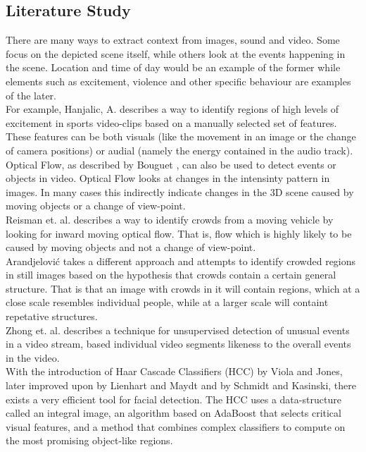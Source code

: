 \subsection{Literature Study}
%
%
There are many ways to extract context from images, sound and video. Some focus on the depicted scene itself, while others look at the events happening in the scene. Location and time of day would be an example of the former while elements such as excitement, violence and other specific behaviour are examples of the later.\\
For example, Hanjalic, A. \cite{citeulike:405480} describes a way to identify regions of high levels of excitement in sports video-clips based on a manually selected set of features. These features can be both visuals (like the movement in an image or the change of camera positions) or audial (namely the energy contained in the audio track).\\
Optical Flow, as described by Bouguet \cite{Bouguet2000}, can also be used to detect events or objects in video. Optical Flow looks at changes in the intensinty pattern in images. In many cases this indirectly indicate changes in the 3D scene caused by moving objects or a change of view-point.\\
Reisman et. al. \cite{CrowdDetectionInVideoSequences} describes a way to identify crowds from a moving vehicle by looking for inward moving optical flow. That is, flow which is highly likely to be caused by moving objects and not a change of view-point.\\
Arandjelović \cite{Arandjelovic08crowddetection} takes a different approach and attempts to identify crowded regions in still images based on the hypothesis that crowds contain a certain general structure. That is that an image with crowds in it will contain regions, which at a close scale resembles individual people, while at a larger scale will containt repetative structures.\\
Zhong et. al. \cite{10.1109/CVPR.2004.78} describes a technique for unsupervised detection of unusual events in a video stream, based individual video segments likeness to the overall events in the video.
\\
%
With the introduction of Haar Cascade Classifiers (HCC) by Viola and Jones\cite{viola01}, later improved upon by Lienhart and Maydt\cite{lienhart01} and by Schmidt and Kasinski\cite{schmidt01}\cite{schmidt02}, there exists a very efficient tool for facial detection. The HCC uses a data-structure called an integral image, an algorithm based on AdaBoost that selects critical visual features, and a method that combines complex classifiers to compute on the most promising object-like regions.
